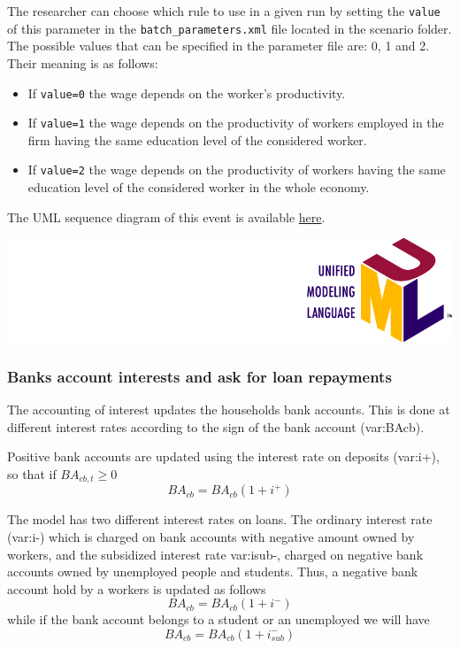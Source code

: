 \documentclass{book}
\newcommand{\doclocation}{file:///Users/giulioni/Documents/workspace/gabriele/docs}
\begin{document}
\vskip2mm
The researcher can choose which rule to use in a given run by setting the \verb+value+ of this parameter in the \verb+batch_parameters.xml+ file located in the scenario folder.
The possible values that can be specified in the parameter file are: 0, 1 and 2. Their meaning is as follows:
\begin{itemize}
	\item 
		If \verb+value=0+ the wage depends on the worker's productivity.
	\item 
		If \verb+value=1+ the wage depends on the productivity of workers employed in the firm having the same education level of the considered worker.
	\item 
		If \verb+value=2+ the wage depends on the productivity of workers having the same education level of the considered worker in the whole economy.

\end{itemize}

The UML sequence diagram of this event is available \href{\doclocation/umldoc/setWorkersWage.html}{here}.
\begin{marginfigure}
	\includegraphics[scale=0.1]{uml.png}
\end{marginfigure}

\subsubsection{Banks account interests and ask for loan repayments}

The accounting of interest updates the households bank accounts. This is done at different interest rates according to the sign of the bank account (\gls{var:BAcb}).

Positive bank accounts are updated using the interest rate on deposits (\gls{var:i+}), so that if $BA_{cb,t}\ge 0$
\[
BA_{cb}=BA_{cb}(1+i^+)
\]

The model has two different interest rates on loans. The ordinary interest rate (\gls{var:i-}) which is charged on bank accounts with negative amount owned by workers, and the subsidized interest rate \gls{var:isub-}, charged on negative bank accounts owned by unemployed people and students. Thus, a negative bank account hold by a workers is updated as follows 
\[
BA_{cb}=BA_{cb}(1+i^-)
\]
while if the bank account belongs to a student or an unemployed we will have 
\[
	BA_{cb}=BA_{cb}(1+i^-_{sub})
\]
\end{document}
